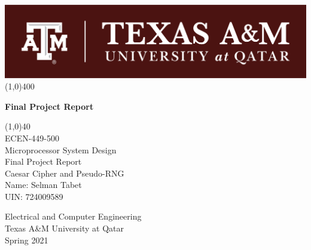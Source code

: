 \begin{titlepage}
\begin{center}
\includegraphics[scale=1.5]{Figures/TAMUQ.png}
\line(1,0){400}\\
[2mm]
\begin{huge}
\textbf{Final Project Report}\\ 
\end{huge}
\begin{LARGE}
\line(1,0){40}\\
[1.5cm]
ECEN-449-500\\
Microprocessor System Design\\
[3cm]
Final Project Report\\
Caesar Cipher and Pseudo-RNG\\ 
[2.5cm]
Name: Selman Tabet\\
UIN: 724009589\\
[4cm]
\end{LARGE}
\begin{large}
Electrical and Computer Engineering\\
Texas A&M University at Qatar\\
Spring 2021
\end{large}
\end{center} 
\end{titlepage}